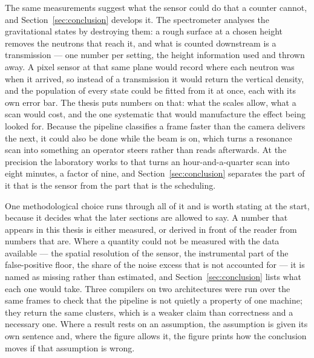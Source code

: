 \documentclass[a4paper,headsepline,oneside,11pt]{scrartcl}
\begin{document}
The same measurements suggest what the sensor could do that a counter cannot,
and Section~\ref{sec:conclusion} develops it. The spectrometer analyses the
gravitational states by destroying them: a rough surface at a chosen height
removes the neutrons that reach it, and what is counted downstream is a
transmission --- one number per setting, the height information used and thrown
away. A pixel sensor at that same plane would record where each neutron was
when it arrived, so instead of a transmission it would return the vertical
density, and the population of every state could be fitted from it at once, each
with its own error bar. The thesis puts numbers on that: what the scales allow,
what a scan would cost, and the one systematic that would manufacture the effect
being looked for. Because the pipeline classifies a frame faster than the camera
delivers the next, it could also be done while the beam is on, which turns a
resonance scan into something an operator steers rather than reads afterwards.
At the precision the laboratory works to that turns an
hour-and-a-quarter scan into eight minutes, a factor of nine, and
Section~\ref{sec:conclusion} separates the part of it that is the sensor from
the part that is the scheduling.

One methodological choice runs through all of it and is worth stating at the
start, because it decides what the later sections are allowed to say. A number
that appears in this thesis is either measured, or derived in front of the
reader from numbers that are. Where a quantity could not be measured with the
data available --- the spatial resolution of the sensor, the instrumental part
of the false-positive floor, the share of the noise excess that is not accounted
for --- it is named as missing rather than estimated, and Section~\ref{sec:conclusion}
lists what each one would take. Three compilers on two architectures were run
over the same frames to check that the pipeline is not quietly a property of one
machine; they return the same clusters, which is a weaker claim than correctness
and a necessary one. Where a result rests on an assumption, the assumption is
given its own sentence and, where the figure allows it, the figure prints how
the conclusion moves if that assumption is wrong.
\end{document}
